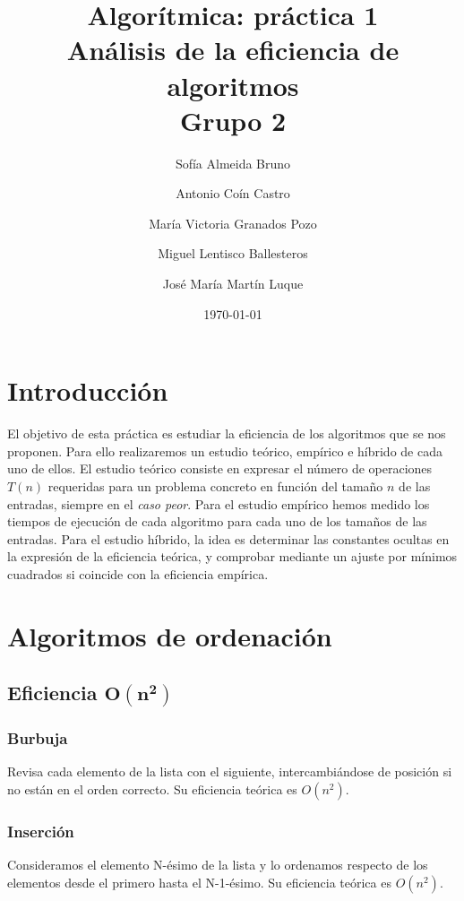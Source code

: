 \documentclass[11pt]{article}
\title{Algorítmica: práctica 1 \\ \large Análisis de la eficiencia de algoritmos\\ \vspace{0.2em}Grupo 2}
\author{Sofía Almeida Bruno \and Antonio Coín Castro \and María Victoria Granados Pozo \and Miguel Lentisco Ballesteros \and José María Martín Luque}
\date{\today}
\begin{document}
\maketitle

\newpage

\section*{Introducción}
El objetivo de esta práctica es estudiar la eficiencia de los algoritmos que se nos proponen. Para ello realizaremos un estudio teórico, empírico e híbrido de cada uno de ellos. 
El estudio teórico consiste en expresar el número de operaciones $T(n)$ requeridas para un problema concreto en función del tamaño $n$ de las entradas, siempre en el \textit{caso peor}. Para el estudio empírico hemos medido los tiempos de ejecución de cada algoritmo para cada uno de los tamaños de las entradas. Para el estudio híbrido, la idea es determinar las constantes ocultas en la expresión de la eficiencia teórica, y comprobar mediante un ajuste por mínimos cuadrados si coincide con la eficiencia empírica.

\section*{Algoritmos de ordenación}
\subsection*{Eficiencia $\boldsymbol{O(n^2)}$}
\subsubsection*{Burbuja}
Revisa cada elemento de la lista con el siguiente, intercambiándose de posición si no están en el orden correcto. Su eficiencia teórica es $O(n^2)$.
\begin{center}
	
\end{center}
\newpage
\subsubsection*{Inserción}
Consideramos el elemento N-ésimo de la lista y lo ordenamos respecto de los elementos desde el primero hasta el N-1-ésimo. Su eficiencia teórica es $O(n^2)$.
\begin{center}
	
\end{center}
\end{document}
